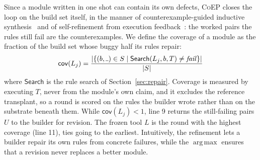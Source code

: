 \documentclass[acmsmall,screen,review,anonymous,nonacm]{acmart}
\DeclareMathOperator*{\argmax}{arg\,max}
\newcommand{\tool}{\textsc{CoEP}\xspace}
\newcommand{\aux}[1]{\ensuremath{\mathsf{#1}}}
\newcommand{\V}[1]{\ensuremath{\mathit{#1}}}
\newcommand{\WC}{\rule{0.4em}{0.4pt}}
\begin{document}
Since a module written in one shot can contain its own defects, \tool closes the loop on the build set itself, in the manner of counterexample-guided inductive synthesis~\cite{solar2006combinatorial} and of self-refinement from execution feedback~\cite{madaan2023self,shinn2023reflexion}: the worked pairs the rules still fail are the counterexamples. We define the coverage of a module as the fraction of the build set whose buggy half its rules repair:
\[
\aux{cov}(L_j) = \frac{|\{ (b, \WC) \in S \mid \aux{Search}(L_j, b, T) \neq \V{fail} \}|}{|S|}
\]
where \aux{Search} is the rule search of Section~\ref{sec:repair}. Coverage is measured by executing $T$, never from the module's own claim, and it excludes the reference transplant, so a round is scored on the rules the builder wrote rather than on the substrate beneath them. While $\aux{cov}(L_j) < 1$, line 9 returns the still-failing pairs $U$ to the builder for revision. The frozen tool $L$ is the round with the highest coverage (line 11), ties going to the earliest. Intuitively, the refinement lets a builder repair its own rules from concrete failures, while the $\argmax$ ensures that a revision never replaces a better module.
\end{document}
